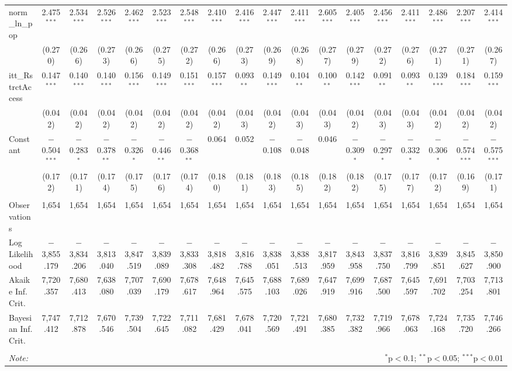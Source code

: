 \begin{sidewaystable}[!htbp]
\begin{tabular}{@{\extracolsep{5pt}}lccccccccccccccccc}
  norm\_ln\_pop & 2.475$^{***}$ & 2.534$^{***}$ & 2.526$^{***}$ & 2.462$^{***}$ & 2.523$^{***}$ & 2.548$^{***}$ & 2.410$^{***}$ & 2.416$^{***}$ & 2.447$^{***}$ & 2.411$^{***}$ & 2.605$^{***}$ & 2.405$^{***}$ & 2.456$^{***}$ & 2.411$^{***}$ & 2.486$^{***}$ & 2.207$^{***}$ & 2.414$^{***}$ \\ 
  & (0.270) & (0.266) & (0.273) & (0.266) & (0.275) & (0.272) & (0.266) & (0.273) & (0.269) & (0.268) & (0.277) & (0.279) & (0.272) & (0.276) & (0.271) & (0.271) & (0.267) \\ 
  itt\_RstrctAccess & 0.147$^{***}$ & 0.140$^{***}$ & 0.140$^{***}$ & 0.156$^{***}$ & 0.149$^{***}$ & 0.151$^{***}$ & 0.157$^{***}$ & 0.093$^{**}$ & 0.149$^{***}$ & 0.104$^{**}$ & 0.100$^{**}$ & 0.142$^{***}$ & 0.091$^{**}$ & 0.093$^{**}$ & 0.139$^{***}$ & 0.184$^{***}$ & 0.159$^{***}$ \\ 
  & (0.042) & (0.042) & (0.042) & (0.042) & (0.042) & (0.042) & (0.042) & (0.043) & (0.042) & (0.043) & (0.043) & (0.042) & (0.043) & (0.043) & (0.042) & (0.042) & (0.042) \\ 
  Constant & $-$0.504$^{***}$ & $-$0.283$^{*}$ & $-$0.378$^{**}$ & $-$0.326$^{*}$ & $-$0.446$^{**}$ & $-$0.368$^{**}$ & 0.064 & 0.052 & $-$0.108 & $-$0.048 & 0.046 & $-$0.309$^{*}$ & $-$0.297$^{*}$ & $-$0.332$^{*}$ & $-$0.306$^{*}$ & $-$0.574$^{***}$ & $-$0.575$^{***}$ \\ 
  & (0.172) & (0.171) & (0.174) & (0.175) & (0.176) & (0.174) & (0.180) & (0.181) & (0.183) & (0.185) & (0.182) & (0.182) & (0.175) & (0.177) & (0.172) & (0.169) & (0.171) \\ 
 \hline \\[-1.8ex] 
Observations & 1,654 & 1,654 & 1,654 & 1,654 & 1,654 & 1,654 & 1,654 & 1,654 & 1,654 & 1,654 & 1,654 & 1,654 & 1,654 & 1,654 & 1,654 & 1,654 & 1,654 \\ 
Log Likelihood & $-$3,855.179 & $-$3,834.206 & $-$3,813.040 & $-$3,847.519 & $-$3,839.089 & $-$3,833.308 & $-$3,818.482 & $-$3,816.788 & $-$3,838.051 & $-$3,838.513 & $-$3,817.959 & $-$3,843.958 & $-$3,837.750 & $-$3,816.799 & $-$3,839.851 & $-$3,845.627 & $-$3,850.900 \\ 
Akaike Inf. Crit. & 7,720.357 & 7,680.413 & 7,638.080 & 7,707.039 & 7,690.179 & 7,678.617 & 7,648.964 & 7,645.575 & 7,688.103 & 7,689.026 & 7,647.919 & 7,699.916 & 7,687.500 & 7,645.597 & 7,691.702 & 7,703.254 & 7,713.801 \\ 
Bayesian Inf. Crit. & 7,747.412 & 7,712.878 & 7,670.546 & 7,739.504 & 7,722.645 & 7,711.082 & 7,681.429 & 7,678.041 & 7,720.569 & 7,721.491 & 7,680.385 & 7,732.382 & 7,719.966 & 7,678.063 & 7,724.168 & 7,735.720 & 7,746.266 \\ 
\hline 
\hline \\[-1.8ex] 
\textit{Note:}  & \multicolumn{17}{r}{$^{*}$p$<$0.1; $^{**}$p$<$0.05; $^{***}$p$<$0.01} \\ 
\end{tabular} 
\end{sidewaystable} 
